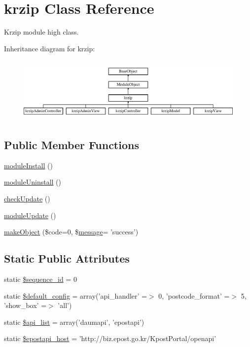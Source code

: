 \hypertarget{classkrzip}{\section{krzip Class Reference}
\label{classkrzip}
}


Krzip module high class.  


Inheritance diagram for krzip\-:\begin{figure}[H]
\begin{center}
\leavevmode
\includegraphics[height=3.246377cm]{classkrzip}
\end{center}
\end{figure}
\subsection*{Public Member Functions}
\begin{DoxyCompactItemize}
\item 
\hyperlink{classkrzip_a371b29c87ac399b00c25b0f248f3276b}{module\-Install} ()
\item 
\hyperlink{classkrzip_a99257cebec8e4da44afc1b7a196e976a}{module\-Uninstall} ()
\item 
\hyperlink{classkrzip_a3165d4b5f7c38451255422b45d529dfd}{check\-Update} ()
\item 
\hyperlink{classkrzip_a074a1ebc11e456bf04a10811e791ad2a}{module\-Update} ()
\item 
\hyperlink{classkrzip_af3bc3878b879a208ae61436c6b711964}{make\-Object} (\$code=0, \$\hyperlink{classmessage}{message}= 'success')
\end{DoxyCompactItemize}
\subsection*{Static Public Attributes}
\begin{DoxyCompactItemize}
\item 
static \hyperlink{classkrzip_a3fb8e2f6cc124b1f2a21a57e47e09c52}{\$sequence\-\_\-id} = 0
\item 
static \hyperlink{classkrzip_a273480de1b1fabd56c60664a8a102eba}{\$default\-\_\-config} = array('api\-\_\-handler' =$>$ 0, 'postcode\-\_\-format' =$>$ 5, 'show\-\_\-box' =$>$ 'all')
\item 
static \hyperlink{classkrzip_afee7eef2a7778ebccc923fca06523dad}{\$api\-\_\-list} = array('daumapi', 'epostapi')
\item 
static \hyperlink{classkrzip_af44a847e3242f0cc5ad1ac3ddf679b93}{\$epostapi\-\_\-host} = 'http\-://biz.\-epost.\-go.\-kr/Kpost\-Portal/openapi'
\end{DoxyCompactItemize}
